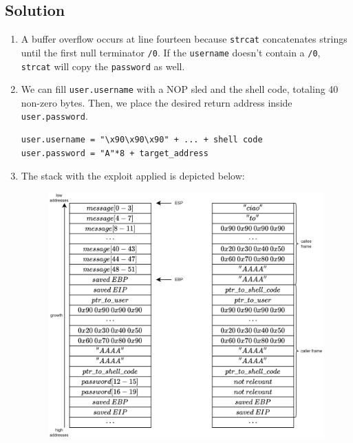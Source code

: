 \subsection*{Solution}
\begin{enumerate}
    \item A buffer overflow occurs at line fourteen because \texttt{strcat} concatenates strings until the first null terminator \texttt{/0}.
        If the \texttt{username} doesn't contain a \texttt{/0}, \texttt{strcat} will copy the \texttt{password} as well.
    \item We can fill \texttt{user.username} with a NOP sled and the shell code, totaling 40 non-zero bytes. 
        Then, we place the desired return address inside \texttt{user.password}.
        \begin{verbatim}
user.username = "\x90\x90\x90" + ... + shell code
user.password = "A"*8 + target_address
        \end{verbatim}
    \item The stack with the exploit applied is depicted below:
        \begin{figure}[H]
            \centering
            \includegraphics[width=0.75\linewidth]{images/stack8.png}
        \end{figure}
\end{enumerate}